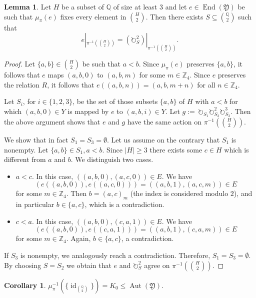 \documentclass{amsart}
\theoremstyle{definition}
\newtheorem{lemma}[theorem]{Lemma}
\newtheorem{corollary}[theorem]{Corollary}
\theoremstyle{remark}
\numberwithin{equation}{section}
\newcommand{\mZ}{\mathbb Z}
\newcommand{\aut}{\operatorname{Aut}}
\newcommand{\eend}{\operatorname{End}}
\newcommand{\id}{\operatorname{id}}
\newcommand{\upairs}{{{\mathbb Q}\choose 2}}
\newcommand{\fy}{\mathfrak{Y}}
\newcommand{\rotate}{\circlearrowright}
\begin{document}
\begin{lemma}\label{local_flip}
	Let $H$ be a subset of ${\mathbb Q}$ of size at least 3 and let $e\in \eend(\fy)$ be such that $\mu_{\pi}(e)$ fixes every element in ${H\choose 2}$. Then there exists $S\subseteq \upairs$ such that $$e|_{\pi^{-1}({H\choose 2})}=(\rotate_S^2)|_{\pi^{-1}({H\choose 2})}.$$
\end{lemma} 

\begin{proof}
	Let $\{a,b\}\in {H\choose 2}$ be such that $a<b$. Since $\mu_{\pi}(e)$ preserves $\{a,b\}$, it follows that $e$ maps $(a,b,0)$ to $(a,b,m)$ for some $m \in \mZ_4$. Since $e$ preserves the relation $R$, it follows that $e((a,b,n))=(a,b,m+n)$ for all $n \in \mZ_4$. 
	
	
	Let $S_i$, for $i \in \{1,2,3\}$, be the set of those subsets $\{a,b\}$ {of $H$} with $a<b$ for which $(a,b,0) \in Y$ is mapped by $e$ to $(a,b,i) \in Y$. Let $g:=\,\rotate_{S_1}\rotate_{S_2}^2\rotate_{S_3}^3$. Then the above argument shows that $e$ and $g$ have the same action on ${\pi^{-1}({H\choose 2})}$. 

	We show that in fact $S_1=S_3=\emptyset$. Let us assume on the contrary that $S_1$ is nonempty. Let $\{a,b\}\in S_1, a<b$. Since $|H|\geq 3$ there exists some $c\in H$ which is different from $a$ and $b$. We distinguish two cases.
    \begin{itemize}
        \item $a<c$. In this case, $((a,b,0),(a,c,0))\in E$. We have $$(e((a,b,0)),e((a,c,0)))=((a,b,1),(a,c,m)) \in E$$ for some $m\in \mZ_4$. Then $b=(a,c)_m$ (the index is considered modulo $2$), and in particular $b\in \{a,c\}$, which is a contradiction.
        \item $c<a$. In this case, $((a,b,0),(c,a,1))\in E$. We have $$(e((a,b,0)),e((c,a,1)))=((a,b,1),(c,a,m)) \in E$$ for some $m\in \mZ_4$. Again, $b\in \{a,c\}$, a contradiction.
    \end{itemize}
    If $S_3$ is nonempty, we analogously reach a contradiction. 
	Therefore, $S_1=S_3=\emptyset$. By choosing $S=S_2$ we obtain that $e$ and $\rotate_S^2$ agree on $\pi^{-1}({H\choose 2})$.
\end{proof}

\begin{corollary}\label{cor:kernel}
	$\mu_{\pi}^{-1}(\{\id_{\upairs}\}) = K_0 \leq \aut({\fy})$.
\end{corollary}
\end{document}
